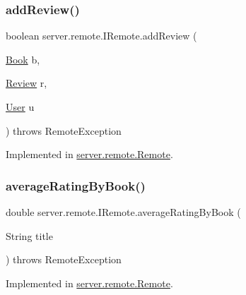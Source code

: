 \subsubsection{\texorpdfstring{add\+Review()}{addReview()}}
{\footnotesize\ttfamily boolean server.\+remote.\+I\+Remote.\+add\+Review (\begin{DoxyParamCaption}\item[{\hyperlink{classserver_1_1data_1_1_book}{Book}}]{b,  }\item[{\hyperlink{classserver_1_1data_1_1_review}{Review}}]{r,  }\item[{\hyperlink{classserver_1_1data_1_1_user}{User}}]{u }\end{DoxyParamCaption}) throws Remote\+Exception}



Implemented in \hyperlink{classserver_1_1remote_1_1_remote_af94163cf6d5c40cfc880eb517d56aa48}{server.\+remote.\+Remote}.

\mbox{\label{interfaceserver_1_1remote_1_1_i_remote_a4a53942c94debc835f1817b2753722de}} 
\subsubsection{\texorpdfstring{average\+Rating\+By\+Book()}{averageRatingByBook()}}
{\footnotesize\ttfamily double server.\+remote.\+I\+Remote.\+average\+Rating\+By\+Book (\begin{DoxyParamCaption}\item[{String}]{title }\end{DoxyParamCaption}) throws Remote\+Exception}



Implemented in \hyperlink{classserver_1_1remote_1_1_remote_afd253ddc199a34a1e05317878f957cc9}{server.\+remote.\+Remote}.

\mbox{\label{interfaceserver_1_1remote_1_1_i_remote_a11c915f0c22728be1898d46a78ac92cf}} 
